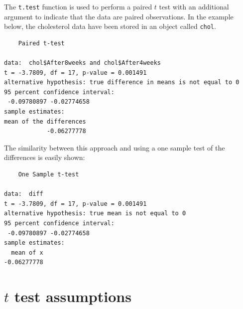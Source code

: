\documentclass[
  oneside]{krantz}
\newenvironment{Shaded}{\begin{snugshade}}{\end{snugshade}}
\newcommand{\AttributeTok}[1]{\textcolor[rgb]{0.77,0.63,0.00}{#1}}
\newcommand{\CommentTok}[1]{\textcolor[rgb]{0.56,0.35,0.01}{\textit{#1}}}
\newcommand{\ConstantTok}[1]{\textcolor[rgb]{0.00,0.00,0.00}{#1}}
\newcommand{\DecValTok}[1]{\textcolor[rgb]{0.00,0.00,0.81}{#1}}
\newcommand{\FunctionTok}[1]{\textcolor[rgb]{0.00,0.00,0.00}{#1}}
\newcommand{\NormalTok}[1]{#1}
\newcommand{\OtherTok}[1]{\textcolor[rgb]{0.56,0.35,0.01}{#1}}
\newcommand{\SpecialCharTok}[1]{\textcolor[rgb]{0.00,0.00,0.00}{#1}}
\begin{document}
The \texttt{t.test} function is used to perform a paired \(t\) test with an additional argument to indicate that the data are paired observations. In the example below, the cholesterol data have been stored in an object called \texttt{chol}.

\begin{Shaded}
\end{Shaded}

\begin{verbatim}
    Paired t-test

data:  chol$After8weeks and chol$After4weeks
t = -3.7809, df = 17, p-value = 0.001491
alternative hypothesis: true difference in means is not equal to 0
95 percent confidence interval:
 -0.09780897 -0.02774658
sample estimates:
mean of the differences 
            -0.06277778 
\end{verbatim}

The similarity between this approach and using a one sample test of the differences is easily shown:

\begin{Shaded}
\end{Shaded}

\begin{verbatim}
    One Sample t-test

data:  diff
t = -3.7809, df = 17, p-value = 0.001491
alternative hypothesis: true mean is not equal to 0
95 percent confidence interval:
 -0.09780897 -0.02774658
sample estimates:
  mean of x 
-0.06277778 
\end{verbatim}

\hypertarget{t-test-assumptions}{%
\section{\texorpdfstring{\(t\) test assumptions}{t test assumptions}}\label{t-test-assumptions}}
\end{document}
